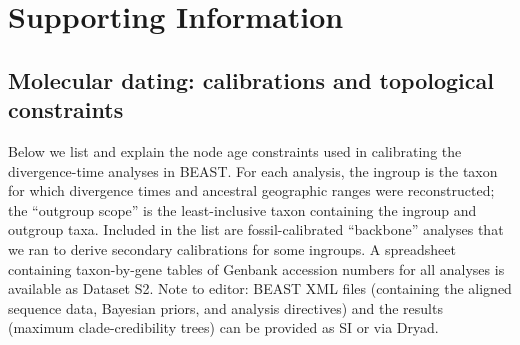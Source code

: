\section*{Supporting Information}

\subsection*{Molecular dating: calibrations and topological constraints}






Below we list and explain the node age constraints used in calibrating
the divergence-time analyses in BEAST. For each analysis, the ingroup
is the taxon for which divergence times and ancestral geographic
ranges were reconstructed; the ``outgroup scope'' is the
least-inclusive taxon containing the ingroup and outgroup
taxa. Included in the list are fossil-calibrated ``backbone'' analyses
that we ran to derive secondary calibrations for some ingroups. A
spreadsheet containing taxon-by-gene tables of Genbank accession
numbers for all analyses is available as Dataset S2. {\color{red}Note
  to editor: BEAST XML files (containing the aligned sequence data,
  Bayesian priors, and analysis directives) and the results (maximum
  clade-credibility trees) can be provided as SI or via Dryad.}

